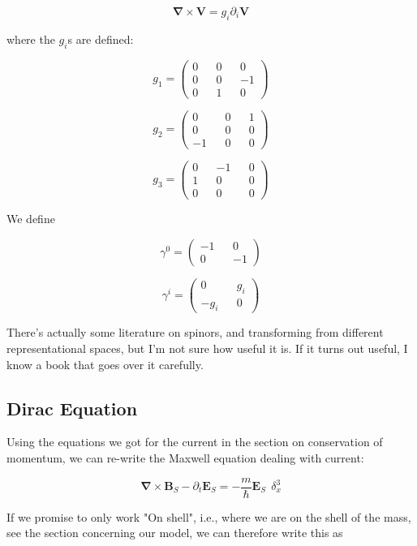 \documentclass {article}
\renewcommand\vec{\mathbf}
\let\OldS\nabla
\renewcommand{\nabla}{\boldsymbol{\OldS}}
\begin{document}
$$\nabla \times \vec V = g_i \partial_i \vec V $$

where the $g_i$s are defined:

$$g_1 = \left(\begin{matrix}  0 && 0 && 0 \\ 0 && 0 && -1 \\ 0 && 1 && 0 \end{matrix}\right) $$

$$g_2 = \left(\begin{matrix}  0 && 0 && 1 \\ 0 && 0 && 0 \\ -1 && 0 && 0 \end{matrix}\right) $$

$$g_3 = \left(\begin{matrix}  0 && -1 && 0 \\ 1 && 0 && 0 \\ 0 && 0 && 0 \end{matrix}\right) $$


We  define 

$$\gamma^0 = \left(\begin{matrix}  -1 && 0 \\ 0 && -1 \end{matrix}\right)$$

$$\gamma^i = \left(\begin{matrix}  0 && g_i \\ -g_i && 0 \end{matrix}\right)$$

There's actually some literature on spinors, and transforming from different representational spaces, but I'm not sure how useful it is. If it turns out useful, I know a book that goes over it carefully. 

\newpage

\subsection{Dirac Equation}



Using the equations we got for the current in the section on conservation of momentum, we can re-write the Maxwell equation dealing with current:

$$\nabla \times \vec B_S  - \partial_t \vec E_S  = - \frac m {\hbar} \vec E_S ~~ \delta^3_x$$

If we promise to only work "On shell", i.e., where we are on the shell of the mass, see the section concerning our model, we can therefore write this as
\end{document}
